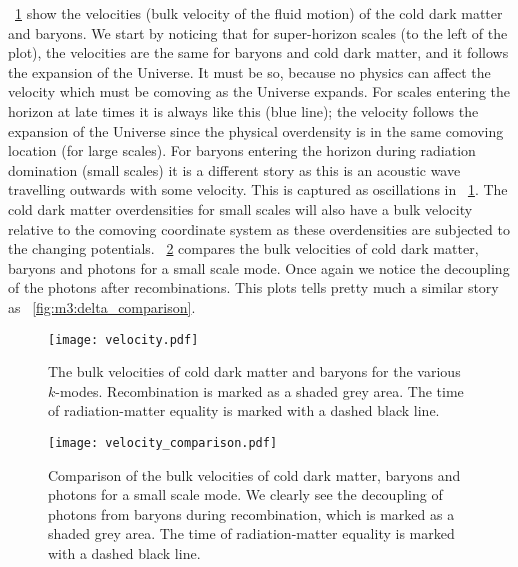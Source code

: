     ~\cref{fig:m3:velocity} show the velocities (bulk velocity of the fluid motion) of the cold dark matter and baryons. We start by noticing that for super-horizon scales (to the left of the plot), the velocities are the same for baryons and cold dark matter, and it follows the expansion of the Universe. It must be so, because no physics can affect the velocity which must be comoving as the Universe expands. For scales entering the horizon at late times it is always like this (blue line); the velocity follows the expansion of the Universe since the physical overdensity is in the same comoving location (for large scales). For baryons entering the horizon during radiation domination (small scales) it is a different story as this is an acoustic wave travelling outwards with some velocity. This is captured as oscillations in ~\cref{fig:m3:velocity}. The cold dark matter overdensities for small scales will also have a bulk velocity relative to the comoving coordinate system as these overdensities are subjected to the changing potentials. ~\cref{fig:m3:velocity_comparison} compares the bulk velocities of cold dark matter, baryons and photons for a small scale mode. Once again we notice the decoupling of the photons after recombinations. This plots tells pretty much a similar story as ~\cref{fig:m3:delta_comparison}.

    \begin{figure}
        \texttt{[image: velocity.pdf]}
        \caption{The bulk velocities of cold dark matter and baryons for the various $k$-modes. Recombination is marked as a shaded grey area. The time of radiation-matter equality is marked with a dashed black line.}
        \label{fig:m3:velocity}
    \end{figure}
    
    \begin{figure}
        \texttt{[image: velocity\_comparison.pdf]}
        \caption{Comparison of the bulk velocities of cold dark matter, baryons and photons for a small scale mode. We clearly see the decoupling of photons from baryons during recombination, which is marked as a shaded grey area. The time of radiation-matter equality is marked with a dashed black line.}
        \label{fig:m3:velocity_comparison}
    \end{figure}
    

